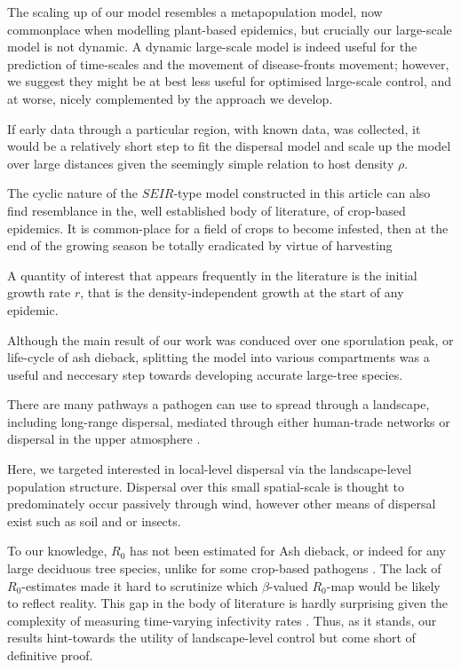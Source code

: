 The scaling up of our model resembles a metapopulation model, now commonplace when modelling plant-based epidemics, but crucially our large-scale model is not dynamic. A dynamic large-scale model is indeed useful for the prediction of time-scales and the movement of disease-fronts movement; however, we suggest they might be at best less useful for optimised large-scale control, and at worse, nicely complemented by the approach we develop.

If early data through a particular region, with known data, was collected, it would be a relatively short step to fit the dispersal model and scale up the model over large distances given the seemingly simple relation to host density $\rho$.

The cyclic nature of the $SEIR$-type model constructed in this article can also find resemblance in the, well established body of literature, of crop-based epidemics. It is common-place for a field of crops to become infested, then at the end of the growing season be totally eradicated by virtue of harvesting %

A quantity of interest that appears frequently in the literature is the initial growth rate $r$, that is the density-independent growth at the start of any epidemic.

Although the main result of our work was conduced over one sporulation peak, or life-cycle of ash dieback, splitting the model into various compartments was a useful and neccesary step towards developing accurate large-tree species.%

There are many pathways a pathogen can use to spread through a landscape, including long-range dispersal, mediated through either human-trade networks %
\cite{hulme2009trade, banks2015role, chapman2017global} or dispersal in the upper atmosphere \cite{westbrook1999atmospheric, isard2005principles}.

Here, we targeted interested in local-level dispersal via the landscape-level population structure. Dispersal over this small spatial-scale is thought to predominately occur passively through wind, however other  means of dispersal exist such as soil and or insects.

To our knowledge, $R_0$ has not been estimated for Ash dieback, or indeed for any large deciduous tree species, unlike for some crop-based pathogens \cite{segarra2001epidemic}. The lack of $R_0$-estimates made it hard to scrutinize which $\beta$-valued $R_0$-map would be likely to reflect reality. This gap in the body of literature is hardly surprising given the complexity of measuring time-varying infectivity rates \cite{13-challenges}. Thus, as it stands, our results hint-towards the utility of landscape-level control but come short of definitive proof.

